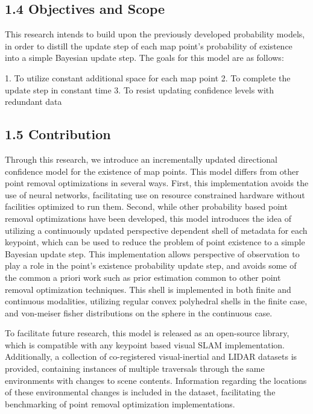 \documentclass[12pt]{article}
\begin{document}
\subsection{1.4 Objectives and Scope}

This research intends to build upon the previously developed probability models, in order to distill the update step of each map point's probability of existence into a simple Bayesian update step. The goals for this model are as follows:

1. To utilize constant additional space for each map point
2. To complete the update step in constant time
3. To resist updating confidence levels with redundant data

\subsection{1.5 Contribution}

Through this research, we introduce an incrementally updated directional confidence model for the existence of map points. This model differs from other point removal optimizations in several ways. First, this implementation avoids the use of neural networks, facilitating use on resource constrained hardware without facilities optimized to run them. Second, while other probability based point removal optimizations have been developed, this model introduces the idea of utilizing a continuously updated perspective dependent shell of metadata for each keypoint, which can be used to reduce the problem of point existence to a simple Bayesian update step. This implementation allows perspective of observation to play a role in the point's existence probability update step, and avoids some of the common a priori work such as prior estimation common to other point removal optimization techniques. This shell is implemented in both finite and continuous modalities, utilizing regular convex polyhedral shells in the finite case, and von-meiser fisher distributions on the sphere in the continuous case.

To facilitate future research, this model is released as an open-source library, which is compatible with any keypoint based visual SLAM implementation. Additionally, a collection of co-registered visual-inertial and LIDAR datasets is provided, containing instances of multiple traversals through the same environments with changes to scene contents. Information regarding the locations of these environmental changes is included in the dataset, facilitating the benchmarking of point removal optimization implementations.
\end{document}
